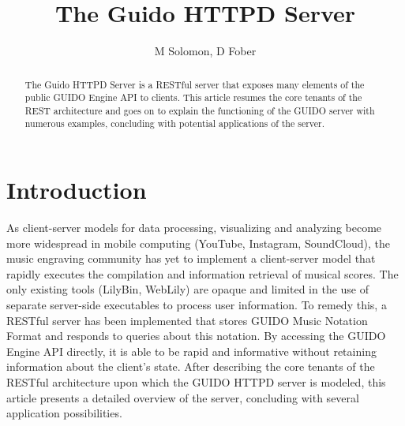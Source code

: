 \documentclass[a4paper]{article}
\title{The Guido HTTPD Server}
\author{M Solomon, D Fober}
\date{}
\begin{document}
\maketitle

\begin{abstract}
The Guido HTTPD Server is a RESTful server that exposes many elements of the public GUIDO Engine API to clients.  This article resumes the core tenants of the REST architecture and goes on to explain the functioning of the GUIDO server with numerous examples, concluding with potential applications of the server.
\end{abstract}


\section{Introduction}
As client-server models for data processing, visualizing and analyzing become more widespread in mobile computing (YouTube, Instagram, SoundCloud), the music engraving community has yet to implement a client-server model that rapidly executes the compilation and information retrieval of musical scores.  The only existing tools (LilyBin, WebLily) are opaque and limited in the use of separate server-side executables to process user information.  To remedy this, a RESTful server has been implemented that stores GUIDO Music Notation Format and responds to queries about this notation.  By accessing the GUIDO Engine API directly, it is able to be rapid and informative without retaining information about the client's state.  After describing the core tenants of the RESTful architecture upon which the GUIDO HTTPD server is modeled, this article presents a detailed overview of the server, concluding with several application possibilities.

\end{document}
